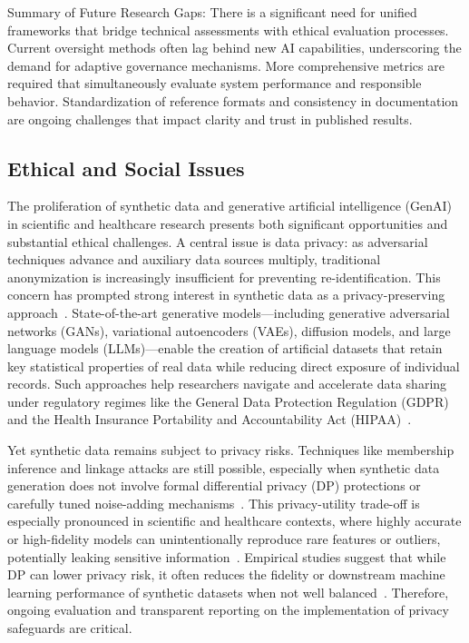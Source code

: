 \documentclass[sigconf]{acmart}
\begin{document}
Summary of Future Research Gaps:
There is a significant need for unified frameworks that bridge technical assessments with ethical evaluation processes.
Current oversight methods often lag behind new AI capabilities, underscoring the demand for adaptive governance mechanisms.
More comprehensive metrics are required that simultaneously evaluate system performance and responsible behavior.
Standardization of reference formats and consistency in documentation are ongoing challenges that impact clarity and trust in published results.

\subsection{Ethical and Social Issues}

The proliferation of synthetic data and generative artificial intelligence (GenAI) in scientific and healthcare research presents both significant opportunities and substantial ethical challenges. A central issue is data privacy: as adversarial techniques advance and auxiliary data sources multiply, traditional anonymization is increasingly insufficient for preventing re-identification. This concern has prompted strong interest in synthetic data as a privacy-preserving approach~\cite{ref8}\cite{ref12}\cite{ref14}\cite{ref16}\cite{ref18}. State-of-the-art generative models—including generative adversarial networks (GANs), variational autoencoders (VAEs), diffusion models, and large language models (LLMs)—enable the creation of artificial datasets that retain key statistical properties of real data while reducing direct exposure of individual records. Such approaches help researchers navigate and accelerate data sharing under regulatory regimes like the General Data Protection Regulation (GDPR) and the Health Insurance Portability and Accountability Act (HIPAA)~\cite{ref1}\cite{ref3}\cite{ref7}\cite{ref11}\cite{ref13}\cite{ref14}\cite{ref16}\cite{ref21}.

Yet synthetic data remains subject to privacy risks. Techniques like membership inference and linkage attacks are still possible, especially when synthetic data generation does not involve formal differential privacy (DP) protections or carefully tuned noise-adding mechanisms~\cite{ref12}\cite{ref14}\cite{ref16}. This privacy-utility trade-off is especially pronounced in scientific and healthcare contexts, where highly accurate or high-fidelity models can unintentionally reproduce rare features or outliers, potentially leaking sensitive information~\cite{ref8}\cite{ref12}\cite{ref18}. Empirical studies suggest that while DP can lower privacy risk, it often reduces the fidelity or downstream machine learning performance of synthetic datasets when not well balanced~\cite{ref12}\cite{ref16}. Therefore, ongoing evaluation and transparent reporting on the implementation of privacy safeguards are critical.
\end{document}
